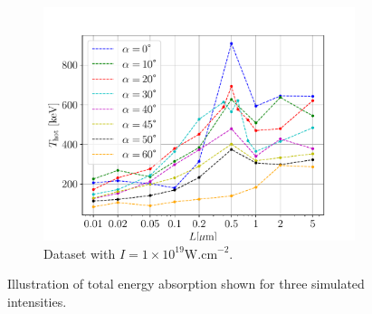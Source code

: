 \begin{figure}[t]
\begin{subfigure}{0.59\textwidth}
		\centering
		\includegraphics[width=\textwidth]{figures/t_hot_l_19}
		\caption{Dataset with $I = 1 \times 10^{19} \mathrm{W.cm}^{-2}$.}
		\label{fig:dataset3-c}
	\end{subfigure}
	\caption{Illustration of total energy absorption shown for three simulated intensities.}
	\label{fig:dataset3}
\end{figure}

